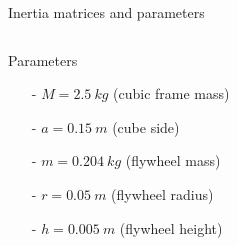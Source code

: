 \begin{frame}[shrink = 10]{Inertia matrices and parameters}
\begin{columns}
\begin{column}{0.5\textwidth}
      \begin{block}{Parameters}
        \begin{itemize}
        \item[-] $M = \SI{2.5}{kg}$ (cubic frame mass)
        \item[-] $a = \SI{0.15}{m}$ (cube side)
        \item[-] $m = \SI{0.204}{kg}$ (flywheel mass)
        \item[-] $r = \SI{0.05}{m}$ (flywheel radius)
        \item[-] $h = \SI{0.005}{m}$ (flywheel height)
        \end{itemize}
      \end{block}
    \end{column}
  \end{columns}
\end{frame}

